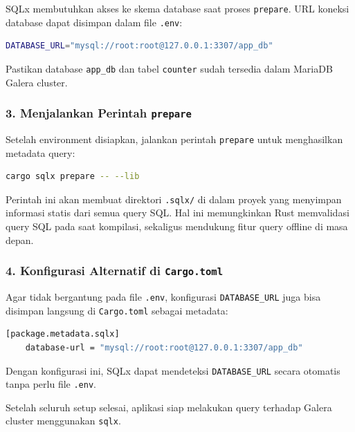 SQLx membutuhkan akses ke skema database saat proses \texttt{prepare}. URL koneksi database dapat disimpan dalam file \texttt{.env}:

\begin{lstlisting}[language=bash, basicstyle=\footnotesize\ttfamily, caption={File .env}, label={lst:env-file}]
	DATABASE_URL="mysql://root:root@127.0.0.1:3307/app_db"
\end{lstlisting}

Pastikan database \texttt{app\_db} dan tabel \texttt{counter} sudah tersedia dalam MariaDB Galera cluster.

\subsubsection*{3. Menjalankan Perintah \texttt{prepare}}

Setelah environment disiapkan, jalankan perintah \texttt{prepare} untuk menghasilkan metadata query:

\begin{lstlisting}[language=bash, basicstyle=\footnotesize\ttfamily, caption={Menjalankan sqlx prepare}, label={lst:sqlx-prepare}]
	cargo sqlx prepare -- --lib
\end{lstlisting}

Perintah ini akan membuat direktori \texttt{.sqlx/} di dalam proyek yang menyimpan informasi statis dari semua query SQL. Hal ini memungkinkan Rust memvalidasi query SQL pada saat kompilasi, sekaligus mendukung fitur query offline di masa depan.

\subsubsection*{4. Konfigurasi Alternatif di \texttt{Cargo.toml}}

Agar tidak bergantung pada file \texttt{.env}, konfigurasi \texttt{DATABASE\_URL} juga bisa disimpan langsung di \texttt{Cargo.toml} sebagai metadata:

\begin{lstlisting}[language=bash, basicstyle=\footnotesize\ttfamily, caption={Konfigurasi database URL di Cargo.toml}, label={lst:sqlx-meta}]
	[package.metadata.sqlx]
	database-url = "mysql://root:root@127.0.0.1:3307/app_db"
\end{lstlisting}

Dengan konfigurasi ini, SQLx dapat mendeteksi \texttt{DATABASE\_URL} secara otomatis tanpa perlu file \texttt{.env}.

Setelah seluruh setup selesai, aplikasi siap melakukan query terhadap Galera cluster menggunakan \texttt{sqlx}.



